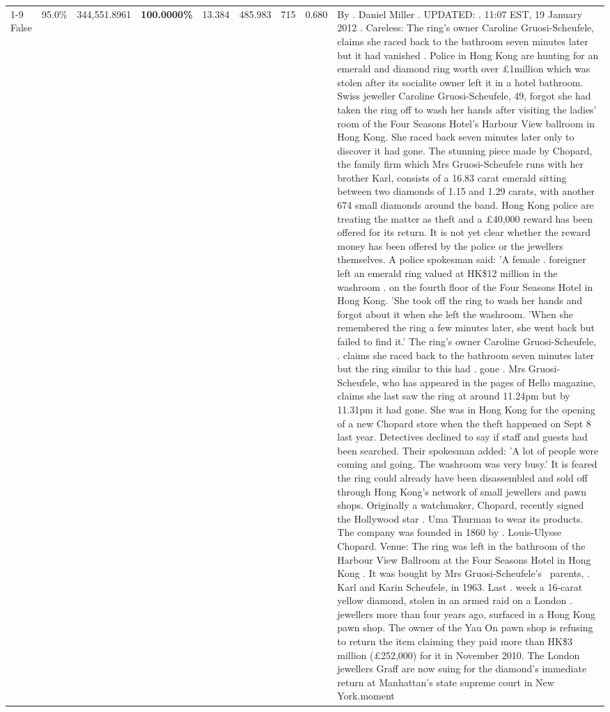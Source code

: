 \begin{table}[H]
\begin{tabular}{lllrlllll}
\cline{1-9}
False & 95.0\% & 344,551.8961 & \bfseries \color{red} 100.0000\% & 13.384 & 485.983 & 715 & 0.680 & By . Daniel Miller . UPDATED: . 11:07 EST, 19 January 2012 . Careless: The ring's owner Caroline Gruosi-Scheufele, claims she raced back to the bathroom seven minutes later but it had vanished . Police in Hong Kong are hunting for an emerald and diamond ring worth over £1million which was stolen after its socialite owner left it in a hotel bathroom. Swiss jeweller Caroline Gruosi-Scheufele, 49, forgot she had taken the ring off to wash her hands after visiting the ladies' room of the Four Seasons Hotel's Harbour View ballroom in Hong Kong. She raced back seven minutes later only to discover it had gone. The stunning piece made by Chopard, the family firm which Mrs Gruosi-Scheufele runs with her brother Karl, consists of a 16.83 carat emerald sitting between two diamonds of 1.15 and 1.29 carats, with another 674 small diamonds around the band. Hong Kong police are treating the matter as theft and a £40,000 reward has been offered for its return. It is not yet clear whether the reward money has been offered by the police or the jewellers themselves. A police spokesman said: 'A female . foreigner left an emerald ring valued at HK\$12 million in the washroom . on the fourth floor of the Four Seasons Hotel in Hong Kong. 'She took off the ring to wash her hands and forgot about it when she left the washroom. 'When she remembered the ring a few minutes later, she went back but failed to find it.' The ring's owner Caroline Gruosi-Scheufele, . claims she raced back to the bathroom seven minutes later but the ring similar to this had . gone . Mrs Gruosi-Scheufele, who has appeared in the pages of Hello magazine, claims she last saw the ring at around 11.24pm but by 11.31pm it had gone. She was in Hong Kong for the opening of a new Chopard store when the theft happened on Sept 8 last year. Detectives declined to say if staff and guests had been searched. Their spokesman added: 'A lot of people were coming and going. The washroom was very busy.' It is feared the ring could already have been disassembled and sold off through Hong Kong's network of small jewellers and pawn shops. Originally a watchmaker, Chopard, recently signed the Hollywood star . Uma Thurman to wear its products. The company was founded in 1860 by . Louis-Ulysse Chopard. Venue: The ring was left in the bathroom of the Harbour View Ballroom at the Four Seasons Hotel in Hong Kong . It was bought by Mrs Gruosi-Scheufele's  parents, . Karl and Karin Scheufele, in 1963. Last . week a 16-carat yellow diamond, stolen in an armed raid on a London . jewellers more than four years ago, surfaced in a Hong Kong pawn shop. The owner of the Yau On pawn shop is refusing to return the item claiming they paid more than HK\$3 million (£252,000) for it in November 2010. The London jewellers Graff are now suing for the diamond’s immediate return at Manhattan’s state supreme court in New York.moment \\

\end{tabular}
\end{table}

